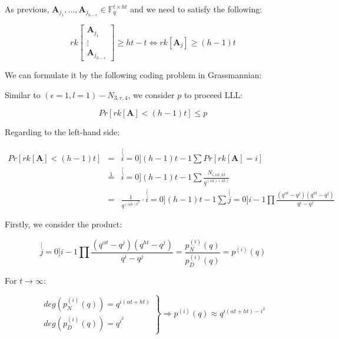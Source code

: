 As previous, $\boldsymbol{A}_{j_{1}},\ldots,\boldsymbol{A}_{j_{h-\epsilon}}\in\ensuremath{\mathbb{F}}_{q}^{t\times ht}$
and we need to satisfy the following:

\[
rk\left[\begin{array}{c}
\boldsymbol{A}_{j_{1}}\\
\vdots\\
\boldsymbol{A}_{j_{h-\epsilon}}
\end{array}\right]\geq ht-t\Leftrightarrow rk\left[\boldsymbol{A}_{j}\right]\geq(h-1)t
\]

We can formulate it by the following coding problem in Grassmannian:

\noindent{}

Similar to $\left(\epsilon=1,l=1\right)-\ensuremath{N}_{3,r,4}$,
we consider $p$ to proceed LLL:

\[
Pr\left[rk\left[\boldsymbol{A}\right]<(h-1)t\right]\leq p
\]

Regarding to the left-hand side:

\begin{eqnarray}
Pr\left[rk\left[\boldsymbol{A}\right]<(h-1)t\right] & = & \stackrel[i=0]{(h-1)t-1}{\mathop{\sum}}Pr\left[rk\left[\boldsymbol{A}\right]=i\right]\nonumber \\
 & \overset{1}{=} & \stackrel[i=0]{(h-1)t-1}{\mathop{\sum}}\frac{N_{i,\alpha t,ht}}{q^{\left(\alpha t\right)\left(ht\right)}}\nonumber \\
 & = & \frac{1}{q^{\left(\alpha h\right)t^{2}}}\cdot\stackrel[i=0]{(h-1)t-1}{\mathop{\sum}}\stackrel[j=0]{i-1}{\mathop{\prod}}\frac{\left(q^{\alpha t}-q^{j}\right)\left(q^{ht}-q^{j}\right)}{q^{i}-q^{j}}\label{eq:general_nw_calc_p}
\end{eqnarray}

Firstly, we consider the product:

\[
\stackrel[j=0]{i-1}{\mathop{\prod}}\frac{\left(q^{\alpha t}-q^{j}\right)\left(q^{ht}-q^{j}\right)}{q^{i}-q^{j}}=\frac{p_{N}^{(i)}(q)}{p_{D}^{(i)}(q)}=p^{(i)}(q)
\]

For $t\rightarrow\infty$:

\[
\left.\begin{array}{c}
deg\left(p_{N}^{(i)}(q)\right)=q^{i(\alpha t+ht)}\\
deg\left(p_{D}^{(i)}(q)\right)=q^{i^{2}}
\end{array}\right\} \Rightarrow p^{(i)}(q)\approx q^{i(\alpha t+ht)-i^{2}}
\]


